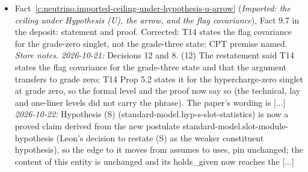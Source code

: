 \documentclass[11pt]{article}
\theoremstyle{definition}
\theoremstyle{plain}
\begin{document}
\begin{itemize}
\item Fact~\ref{c:neutrino.imported-ceiling-under-hypothesis-u-arrow} (\emph{Imported: the ceiling under Hypothesis (U), the arrow, and the flag covariance}), Fact 9.7 in the deposit: statement and proof. Corrected: T14 states the flag covariance for the grade-zero singlet, not the grade-three state; CPT premise named. \emph{Store notes.} \emph{2026-10-21:} Decisions 12 and 8. (12) The restatement said T14 states the flag covariance for the grade-three state and that the argument transfers to grade zero; T14 Prop 5.2 states it for the hypercharge-zero singlet at grade zero, so the formal level and the proof now say so (the technical, lay and one-liner levels did not carry the phrase). The paper's wording is [...] \emph{2026-10-22:} Hypothesis (S) (standard-model.hyp-s-slot-statistics) is now a proved claim derived from the new postulate standard-model.slot-module-hypothesis (Leon's decision to restate (S) as the weaker constituent hypothesis), so the edge to it moves from assumes to uses, pin unchanged; the content of this entity is unchanged and its holds\_given now reaches the [...]
\end{itemize}
\end{document}
